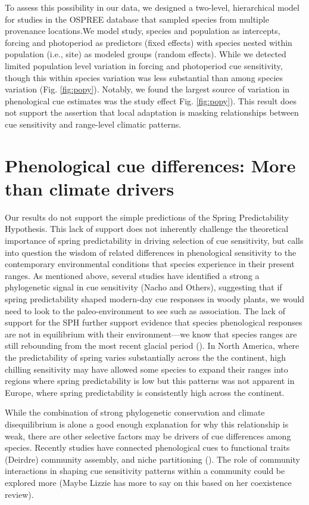 \documentclass[12pt]{article}
\begin{document}
To assess this possibility in our data, we designed a two-level, hierarchical model for studies in the OSPREE database that sampled species from multiple provenance locations.We model study, species and population as intercepts, forcing and photoperiod as predictors (fixed effects) with species nested within population (i.e., site) as modeled groups (random effects). While we detected limited population level variation in forcing and photoperiod cue sensitivity, though this within species variation was less substantial than among species variation (Fig. \ref{fig:popy}). Notably, we found the largest source of variation in phenological cue estimates was the study effect Fig. \ref{fig:popy}). This result does not support the assertion that local adaptation is masking relationships between cue sensitivity and range-level climatic patterns.

\section*{Phenological cue differences: More than climate drivers}

Our results do not support the simple predictions of the Spring Predictability Hypothesis. This lack of support does not inherently challenge the theoretical importance of spring predictability in driving selection of cue sensitivity, but calls into question the wisdom of related differences in phenological sensitivity to the contemporary environmental conditions that species experience in their present ranges. As mentioned above, several studies have identified a strong a phylogenetic signal in cue sensitivity (Nacho and Others), suggesting that if spring predictability shaped modern-day cue responses in woody plants, we would need to look to the paleo-environment to see such as association. The lack of support for the SPH further support evidence that species phenological responses are not in equilibrium with their environment---we know that species ranges are still rebounding from the most recent glacial period (). In North America, where the predictability of spring varies substantially across the the continent, high chilling sensitivity may have allowed some species to expand their ranges into regions where spring predictability is low but this patterns was not apparent in Europe, where spring predictability is consistently high across the continent.

While the combination of strong phylogenetic conservation and climate disequilibrium is alone a good enough explanation for why this relationship is weak, there are other selective factors may be drivers of cue differences among species. Recently studies have connected phenological cues to functional traits (Deirdre) community assembly, and niche partitioning (). The role of community interactions in shaping cue sensitivity patterns within a community could be explored more (Maybe Lizzie has more to say on this based on her coexistence review).
\end{document}
